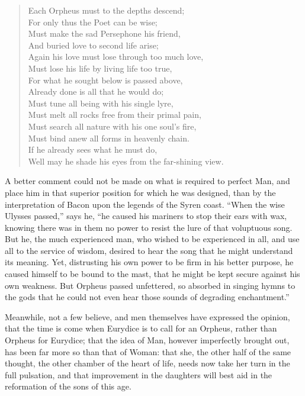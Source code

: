 \begin{verse}
Each Orpheus must to the depths descend;\\
\vin For only thus the Poet can be wise;\\
Must make the sad Persephone his friend,\\
\vin And buried love to second life arise;\\
Again his love must lose through too much love,\\
\vin Must lose his life by living life too true,\\
For what he sought below is passed above,\\
\vin Already done is all that he would do;\\
Must tune all being with his single lyre,\\
\vin Must melt all rocks free from their primal pain,\\
Must search all nature with his one soul's fire,\\
\vin Must bind anew all forms in heavenly chain.\\
If he already sees what he must do,\\
\vin Well may he shade his eyes from the far-shining view.
\end{verse}

A better comment could not be made on what is required to perfect Man,
and place him in that superior position for which he was designed,
than by the interpretation of Bacon upon the legends of the Syren
coast. ``When the wise Ulysses passed,'' says he, ``he caused his
mariners to stop their ears with wax, knowing there was in them no
power to resist the lure of that voluptuous song. But he, the much
experienced man, who wished to be experienced in all, and use all to
the service of wisdom, desired to hear the song that he might
understand its meaning. Yet, distrusting his own power to be firm in
his better purpose, he caused himself to be bound to the mast, that he
might be kept secure against his own weakness. But Orpheus passed
unfettered, so absorbed in singing hymns to the gods that he could not
even hear those sounds of degrading enchantment.''

Meanwhile, not a few believe, and men themselves have expressed the
opinion, that the time is come when Eurydice is to call for an
Orpheus, rather than Orpheus for Eurydice; that the idea of Man,
however imperfectly brought out, has been far more so than that of
Woman:  that she, the other half of the same thought, the
other chamber of the heart of life, needs now take her turn in the
full pulsation, and that improvement in the daughters will best aid in
the reformation of the sons of this age.

